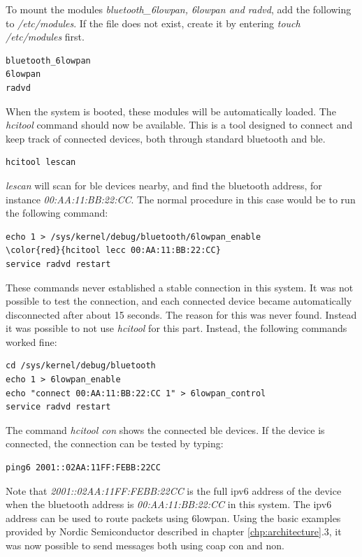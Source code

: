 \noindent To mount the modules \textit{bluetooth\_6lowpan, 6lowpan and radvd}, add the following to \textit{/etc/modules}. If the file does not exist, create it by entering \textit{touch /etc/modules} first. 

\begin{verbatim}
bluetooth_6lowpan
6lowpan
radvd
\end{verbatim}

\noindent When the system is booted, these modules will be automatically loaded. The \textit{hcitool} command should now be available. This is a tool designed to connect and keep track of connected devices, both through standard bluetooth and \gls{ble}. 

\begin{verbatim}
hcitool lescan
\end{verbatim}

\noindent \textit{lescan} will scan for \gls{ble} devices nearby, and find the bluetooth address, for instance \textit{00:AA:11:BB:22:CC}. The normal procedure in this case would be to run the following command: 

\begin{verbatim}
echo 1 > /sys/kernel/debug/bluetooth/6lowpan_enable
\color{red}{hcitool lecc 00:AA:11:BB:22:CC}
service radvd restart
\end{verbatim}

\noindent These commands never established a stable connection in this system. It was not possible to test the connection, and each connected device became automatically disconnected after about 15 seconds. The reason for this was never found. Instead it was possible to not use \textit{hcitool} for this part. Instead, the following commands worked fine:

\begin{verbatim}
cd /sys/kernel/debug/bluetooth
echo 1 > 6lowpan_enable
echo "connect 00:AA:11:BB:22:CC 1" > 6lowpan_control
service radvd restart
\end{verbatim} 

\noindent The command \textit{hcitool con} shows the connected \gls{ble} devices. If the device is connected, the connection can be tested by typing:

\begin{verbatim}
ping6 2001::02AA:11FF:FEBB:22CC
\end{verbatim}


\noindent Note that \textit{2001::02AA:11FF:FEBB:22CC} is the full \gls{ipv6} address of the device when the bluetooth address is \textit{00:AA:11:BB:22:CC} in this system. The \gls{ipv6} address can be used to route packets using \gls{6lowpan}. Using the basic examples provided by Nordic Semiconductor described in chapter \ref{chp:architecture}.3, it was now possible to send messages both using \gls{coap} \gls{con} and \gls{non}.  

